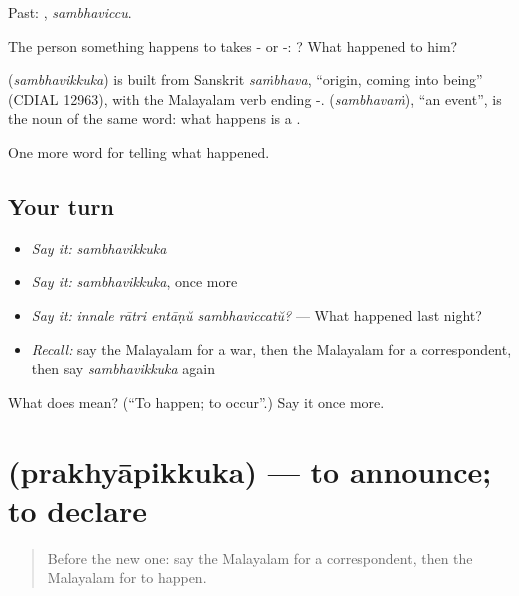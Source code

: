 Past: , \emph{sambhaviccu}.

The person something happens to takes - or -:   ? What happened to him?

\begin{cousinweb}
\textbf{} (\emph{sambhavikkuka}) is built from Sanskrit \emph{saṁbhava}, \textquotedblleft{}origin, coming into being\textquotedblright{} (CDIAL 12963), with the Malayalam verb ending -.  (\emph{sambhavaṁ}), \textquotedblleft{}an event\textquotedblright{}, is the noun of the same word: what happens is a .
\end{cousinweb}

\begin{grammarlens}[title={What you've built}]
One more word for telling what happened.
\end{grammarlens}

\subsection*{Your turn}
\begin{itemize}
\raggedright
  \item \emph{Say it:} \emph{sambhavikkuka}
  \item \emph{Say it:} \emph{sambhavikkuka}, once more
  \item \emph{Say it:} \emph{innale rātri entāṇŭ sambhaviccatŭ?} — What happened last night?
  \item \emph{Recall:} say the Malayalam for a war, then the Malayalam for a correspondent, then say \emph{sambhavikkuka} again
\end{itemize}

\begin{tcolorbox}[breakable,colback=teal!4,colframe=teal!35!black,title={Before you move on}]
What does  mean? (\textquotedblleft{}To happen; to occur\textquotedblright{}.) Say it once more.
\end{tcolorbox}
\section[\texorpdfstring{\ml{പ്രഖ്യാപിക്കുക} (prakhyāpikkuka)}{പ്രഖ്യാപിക്കുക (prakhyāpikkuka)}]{ (prakhyāpikkuka) — to announce; to declare}

\label{lesson:ML-C349-prakhyapikkuka}



\begin{quote}
Before the new one: say the Malayalam for a correspondent, then the Malayalam for to happen.
\end{quote}

